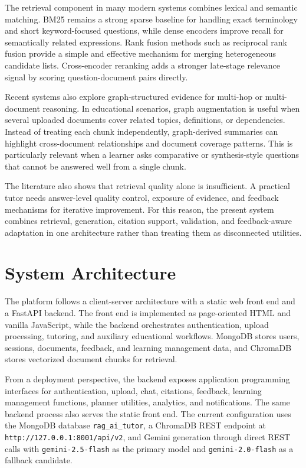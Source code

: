 \documentclass[11pt,a4paper]{article}
\begin{document}
The retrieval component in many modern systems combines lexical and semantic matching. BM25 remains a strong sparse baseline for handling exact terminology and short keyword-focused questions, while dense encoders improve recall for semantically related expressions. Rank fusion methods such as reciprocal rank fusion provide a simple and effective mechanism for merging heterogeneous candidate lists. Cross-encoder reranking adds a stronger late-stage relevance signal by scoring question-document pairs directly.

Recent systems also explore graph-structured evidence for multi-hop or multi-document reasoning. In educational scenarios, graph augmentation is useful when several uploaded documents cover related topics, definitions, or dependencies. Instead of treating each chunk independently, graph-derived summaries can highlight cross-document relationships and document coverage patterns. This is particularly relevant when a learner asks comparative or synthesis-style questions that cannot be answered well from a single chunk.

The literature also shows that retrieval quality alone is insufficient. A practical tutor needs answer-level quality control, exposure of evidence, and feedback mechanisms for iterative improvement. For this reason, the present system combines retrieval, generation, citation support, validation, and feedback-aware adaptation in one architecture rather than treating them as disconnected utilities.

\section{System Architecture}

The platform follows a client-server architecture with a static web front end and a FastAPI backend. The front end is implemented as page-oriented HTML and vanilla JavaScript, while the backend orchestrates authentication, upload processing, tutoring, and auxiliary educational workflows. MongoDB stores users, sessions, documents, feedback, and learning management data, and ChromaDB stores vectorized document chunks for retrieval.

From a deployment perspective, the backend exposes application programming interfaces for authentication, upload, chat, citations, feedback, learning management functions, planner utilities, analytics, and notifications. The same backend process also serves the static front end. The current configuration uses the MongoDB database \texttt{rag\_ai\_tutor}, a ChromaDB REST endpoint at \texttt{http://127.0.0.1:8001/api/v2}, and Gemini generation through direct REST calls with \texttt{gemini-2.5-flash} as the primary model and \texttt{gemini-2.0-flash} as a fallback candidate.
\end{document}
